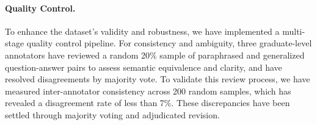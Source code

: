 \documentclass[letterpaper]{article} %
\begin{document}
\paragraph{Quality Control.} 
To enhance the dataset's validity and robustness, we have implemented a multi-stage quality control pipeline. For consistency and ambiguity, three graduate-level annotators have reviewed a random 20\% sample of paraphrased and generalized question-answer pairs to assess semantic equivalence and clarity, and have resolved disagreements by majority vote. To validate this review process, we have measured inter-annotator consistency across 200 random samples, which has revealed a disagreement rate of less than 7\%. These discrepancies have been settled through majority voting and adjudicated revision.
\end{document}
